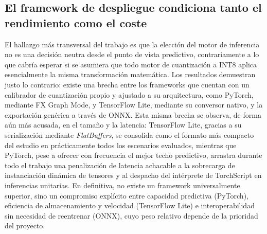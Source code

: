 \documentclass[a4paper,12pt,twoside,final]{book}
\begin{document}
\subsection{El framework de despliegue condiciona tanto el rendimiento como el coste}
El hallazgo más transversal del trabajo es que la elección del motor de inferencia no es una decisión neutra desde el
punto de vista predictivo, contrariamente a lo que cabría esperar si se asumiera que todo motor de cuantización a
INT8 aplica esencialmente la misma transformación matemática. Los resultados demuestran justo lo contrario: existe
una brecha entre los frameworks que cuentan con un calibrador de cuantización propio y ajustado a su arquitectura,
como PyTorch, mediante FX Graph Mode, y TensorFlow Lite, mediante su conversor nativo, y la exportación genérica a
través de ONNX. Esta misma brecha se observa, de forma aún más acusada, en el tamaño y la latencia: TensorFlow Lite,
gracias a su serialización mediante \textit{FlatBuffers}, se consolida como el formato más compacto del estudio en
prácticamente todos los escenarios evaluados, mientras que PyTorch, pese a ofrecer con frecuencia el mejor techo
predictivo, arrastra durante todo el trabajo una penalización de latencia achacable a la sobrecarga de instanciación
dinámica de tensores y al despacho del intérprete de TorchScript en inferencias unitarias. En definitiva, no existe un
framework universalmente superior, sino un compromiso explícito entre capacidad predictiva (PyTorch), eficiencia de
almacenamiento y velocidad (TensorFlow Lite) e interoperabilidad sin necesidad de reentrenar (ONNX), cuyo peso relativo
depende de la prioridad del proyecto.
 
\end{document}
